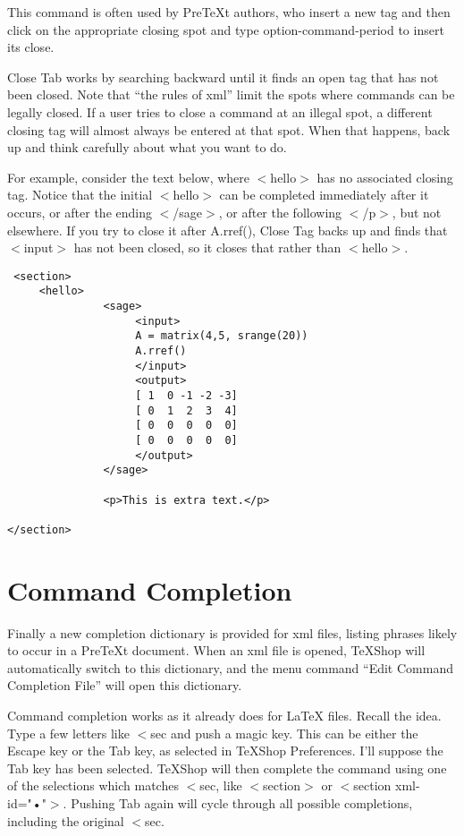 \documentclass[11pt, oneside]{article}   	%
\begin{document}
This command is often used by PreTeXt authors, who insert a new tag and then click on the appropriate closing spot and type option-command-period to insert its close. 

Close Tab works by searching backward until it finds an open tag that has not been closed. Note that ``the rules of xml'' limit the spots where commands can be legally closed. If a user tries to close a command at an illegal spot, a different closing tag will almost always be entered at that spot. When that happens, back up and think carefully about what you want to do.

 For example, consider the text below, where $<$hello$>$ has no associated closing tag.
 Notice that the initial $<$hello$>$ can be completed immediately after it occurs, or after the ending $<$/sage$>$, or after the following $<$/p$>$, but not elsewhere. If you try to close it after A.rref(), Close Tag backs up and finds that $<$input$>$ has not been closed, so it closes that rather than $<$hello$>$.
  

 \begin{verbatim}
 <section>
     <hello>
               <sage>
                    <input>
                    A = matrix(4,5, srange(20))
                    A.rref()
                    </input>
                    <output>
                    [ 1  0 -1 -2 -3]
                    [ 0  1  2  3  4]
                    [ 0  0  0  0  0]
                    [ 0  0  0  0  0]
                    </output>
               </sage>
            
               <p>This is extra text.</p>
            
</section>
\end{verbatim}

\section{Command Completion}

Finally a new completion dictionary is provided for xml files, listing phrases likely to occur in a PreTeXt document. When an xml file is opened, TeXShop will automatically switch to this dictionary, and the menu command ``Edit Command Completion File'' will open this dictionary. 
 
Command completion works as it already does for LaTeX files. Recall the idea. Type a few letters like
$<$sec and push a magic key. This can be either the Escape key or the Tab key, as selected in TeXShop Preferences. I'll suppose the Tab key has been selected. TeXShop will then complete the command using one of the selections which matches $<$sec, like $<$section$>$ or $<$section xml-id="•"$>$. Pushing Tab again will cycle through all possible completions, including the original $<$sec. 
\end{document}
